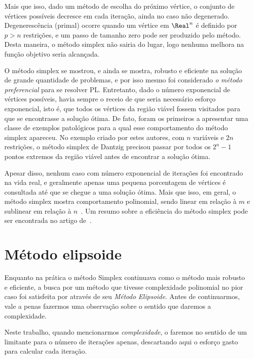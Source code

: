 Mais que isso, dado um método de escolha do próximo vértice, o conjunto de
vértices possíveis decresce em cada iteração,  ainda no caso não degenerado.
Degenerescência (primal) ocorre quando um vértice em $\Real^n$ é definido por
$p>n$ restrições, e um passo de tamanho zero pode ser produzido pelo método. Desta
maneira, o método simplex não sairia do lugar, logo nenhuma melhora na função
objetivo seria alcançada. 


O método simplex se mostrou, e ainda se mostra, robusto e eficiente na solução de grande
quantidade de problemas, e por isso mesmo foi considerado \emph{o método
preferencial} para se resolver \ac{PL}. Entretanto, dado o número exponencial
de  vértices possíveis, havia sempre o receio de que seria necessário esforço
exponencial, isto é, que   todos os vértices da região viável fossem
visitados para que se encontrasse a solução ótima. De fato, \textcite{Klee:1972wi}
foram os primeiros a apresentar uma classe de exemplos patológicos para a qual esse
comportamento  do método simplex apareceu. No exemplo criado por estes
autores, com $n$ variáveis e $2n$ restrições, o método simplex de Dantzig 
precisou passar por todos os $2^n-1$ pontos extremos da região viável antes de
encontrar a solução ótima. 


Apesar disso, nenhum caso com número exponencial de iterações foi encontrado na
vida real, e geralmente apenas uma pequena porcentagem de vértices é
consultada até que se chegue a uma solução ótima. Mais que isso, em geral, o método
simplex mostra comportamento polinomial, sendo linear em relação à $m$ e
sublinear em relação à $n$~\cite[pg.~94]{Fang:1993wu}. Um resumo sobre a
eficiência do método simplex pode ser encontrada no artigo
de~\textcite{Shamir:1987th}.
 

\section{Método elipsoide}

Enquanto na prática o método Simplex continuava como o método mais robusto e
eficiente, a busca por um método que tivesse complexidade polinomial no pior
caso foi satisfeita por \textcite{Khachiyan:A-polynomial-algorithm:1979y} através
de seu  \emph{Método Elipsoide}. Antes de continuarmos, vale a penas fazermos uma observação sobre o sentido que daremos a complexidade.

\begin{obs}
Neste trabalho, quando mencionarmos \emph{complexidade}, o faremos no sentido de um limitante para o número de iterações apenas, descartando aqui o esforço gasto para calcular cada iteração.
\end{obs}


